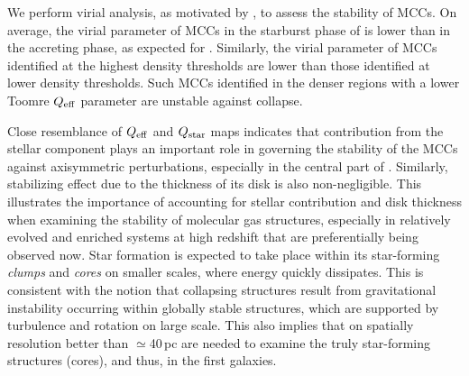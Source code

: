 \IfFileExists{emulateapjlegacy.cls}{\documentclass[iop]{emulateapjlegacy}}{\documentclass[iop]{emulateapj}}
\begin{document}
We perform virial analysis, as motivated by \obs, to assess the stability of MCCs. On average, the virial parameter of MCCs in the starburst phase of \flower is lower than in the accreting phase, as expected for \SF. Similarly, the virial parameter of MCCs identified at the highest density thresholds are lower than those identified at lower density thresholds. Such MCCs identified in the denser regions with a lower Toomre $Q_{\rm eff}$ parameter are unstable against collapse.

Close resemblance of $Q_{\rm eff}$ and $Q_{\rm star}$ maps indicates that contribution from the stellar component plays an important role in governing the stability of the MCCs against axisymmetric perturbations, especially in the central part of \flower. Similarly, stabilizing effect due to the thickness of its disk is also non-negligible. This illustrates the importance of accounting for stellar contribution and disk thickness when examining the stability of molecular gas structures, especially in relatively evolved and enriched systems at high redshift that are preferentially being observed now.
%
Star formation is expected to take place within its star-forming {\it clumps} and {\it cores} on smaller scales, where energy quickly dissipates. This is consistent with the notion that collapsing structures result from gravitational instability occurring within globally stable structures, which are supported by turbulence and rotation on large scale.
%
This also implies that \obs on spatially resolution better than $\simeq$40\,pc are needed to examine the truly star-forming structures (cores), and thus, \SF in the first galaxies.
%
\end{document}
